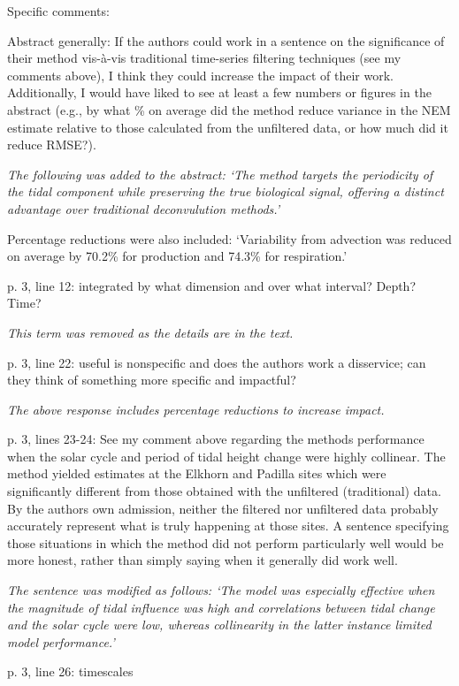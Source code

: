 \documentclass[letterpaper,12pt]{article}\usepackage[]{graphicx}\usepackage[]{color}
\begin{document}
Specific comments:

Abstract generally: If the authors could work in a sentence on the significance of their method vis-à-vis traditional time-series filtering techniques (see my comments above), I think they could increase the impact of their work. Additionally, I would have liked to see at least a few numbers or figures in the abstract (e.g., by what \% on average did the method reduce variance in the NEM estimate relative to those calculated from the unfiltered data, or how much did it reduce
RMSE?).

{\it The following was added to the abstract: `The method targets the periodicity of the tidal component while preserving the true biological signal, offering a distinct advantage over traditional deconvulution methods.'

Percentage reductions were also included: `Variability from advection was reduced on average by 70.2\% for production and 74.3\% for respiration.'
}

p. 3, line 12: integrated by what dimension and over what interval? Depth? Time?

{\it This term was removed as the details are in the text.}

p. 3, line 22: useful is nonspecific and does the authors work a disservice; can they think of
something more specific and impactful?

{\it The above response includes percentage reductions to increase impact.}

p. 3, lines 23-24: See my comment above regarding the methods performance when the solar cycle and period of tidal height change were highly collinear. The method yielded estimates at the Elkhorn and Padilla sites which were significantly different from those obtained with the unfiltered (traditional) data. By the authors own admission, neither the filtered nor unfiltered data probably accurately represent what is truly happening at those sites. A sentence specifying those situations in which the method did not perform particularly well would be more honest, rather than simply saying when it generally did work well.

{\it The sentence was modified as follows: `The model was especially effective when the magnitude of tidal influence was high and correlations between tidal change and the solar cycle were low, whereas collinearity in the latter instance limited model performance.'
}

p. 3, line 26: timescales
\end{document}
